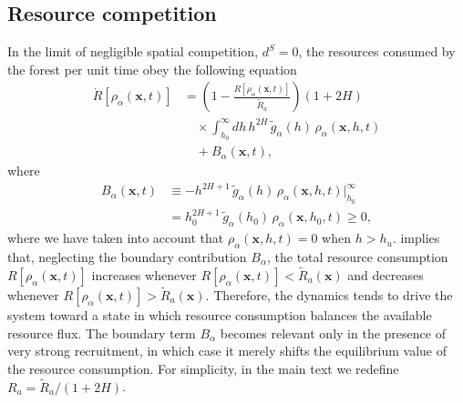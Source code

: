 \documentclass[aps,pre,twocolumn,superscriptaddress,10pt]{revtex4-2}
\begin{document}
\subsection*{Resource competition} In the limit of negligible spatial competition, $d^{S}=0$, the resources consumed by the forest per unit time obey the following equation
\begin{equation}
\begin{split}
\dot{R}\left[\rho_\alpha(\mathbf{x},t)\right] &= \left(1-\frac{R\left[\rho_\alpha(\mathbf{x},t)\right]}{\tilde{R}_a}\right)(1+2H) \\
    &\quad\times \int_{h_0}^{\infty} dh\, h^{2H}\, \tilde{g}_\alpha(h)\, \rho_\alpha(\mathbf{x},h,t) \\
    &\quad + B_\alpha(\mathbf{x},t),
\end{split}
\label{eq:time-evolution-resources}
\end{equation}
where 
\begin{equation}
\begin{split}
    B_{\alpha}(\mathbf{x},t) &\equiv -h^{2H+1}\, \tilde{g}_{\alpha}(h)\, \rho_{\alpha}(\mathbf{x},h,t)\Bigg\vert_{h_0}^\infty \\&= h_0^{2H+1}\, \tilde{g}_{\alpha}(h_0)\, \rho_{\alpha}(\mathbf{x}, h_0,t)\geq 0,
\end{split}
\label{}
\end{equation}
where we have taken into account that $\rho_\alpha(\mathbf{x},h,t)=0$ when $h>h_u$.
 implies that, neglecting the boundary contribution $B_\alpha$, the total resource consumption $R[\rho_\alpha(\mathbf{x},t)]$ increases whenever $R[\rho_\alpha(\mathbf{x},t)]<\tilde{R}_a(\mathbf{x})$ and decreases whenever $R[\rho_\alpha(\mathbf{x},t)]>\tilde{R}_a(\mathbf{x})$. Therefore, the dynamics tends to drive the system toward a state in which resource consumption balances the available resource flux. The boundary term $B_\alpha$ becomes relevant only in the presence of very strong recruitment, in which case it merely shifts the equilibrium value of the resource consumption.
For simplicity, in the main text we redefine $R_a = \tilde{R}_a/(1+2H)$.
\end{document}
